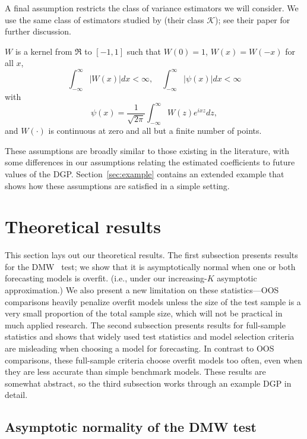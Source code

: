\documentclass[12pt,draft]{article}
\begin{document}
A final assumption restricts the class of variance estimators we will
consider.  We use the same class of estimators studied by
\citet{JoD:00} (their class $\mathcal{K}$); see
their paper for further discussion.

\begin{asmp}
  \label{asmp-5} $W$ is a kernel from
$\Re$ to $[-1,1]$ such that $W(0) = 1$, $W(x) = W(-x)$ for all $x$,
\begin{equation}
  \int_{-\infty}^{\infty} \lvert W(x) \rvert dx < \infty, \quad
  \int_{-\infty}^{\infty} \lvert \psi(x) \rvert dx < \infty
\end{equation}
with
\begin{equation}
  \psi(x) = \frac1{\sqrt{2\pi}} \int_{-\infty}^{\infty} W(z) e^{ixz}dz,
\end{equation}
and $W(\cdot)$ is continuous at zero and all but a finite number of
points.
\end{asmp}

These assumptions are broadly similar to those existing in the
literature, with some differences in our assumptions relating the
estimated coefficients to future values of the DGP.
Section~\ref{sec:example} contains an extended example that shows how
these assumptions are satisfied in a simple setting.

\section{Theoretical results}
\label{sec:theory}

This section lays out our theoretical results. The first subsection
presents results for the DMW \oost\ test; we show that it is
asymptotically normal when one or both forecasting models is overfit.
(i.e., under our increasing-$K$ asymptotic approximation.) We also
present a new limitation on these statistics---OOS comparisons heavily
penalize overfit models unless the size of the test sample is a very
small proportion of the total sample size, which will not be practical
in much applied research. The second subsection presents results for
full-sample statistics and shows that widely used test statistics and
model selection criteria are misleading when choosing a model for
forecasting. In contrast to OOS comparisons, these full-sample
criteria choose overfit models too often, even when they are less
accurate than simple benchmark models. These results are somewhat
abstract, so the third subsection works through an example DGP in
detail.

\subsection{Asymptotic normality of the DMW test}
\label{sec:oostheory}
\end{document}
